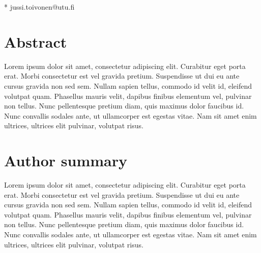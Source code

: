 \documentclass[10pt,letterpaper]{article}
\newcommand{\turku}{Turku, Finland}
\newcommand{\utu}{University of Turku}
\newcommand{\deptft}{Dept.\ of Future Technologies}
\begin{document}
\begin{flushleft}
% 


* jussi.toivonen@utu.fi

\end{flushleft}
\section*{Abstract}
Lorem ipsum dolor sit amet, consectetur adipiscing elit. Curabitur eget porta erat. Morbi consectetur est vel gravida pretium. Suspendisse ut dui eu ante cursus gravida non sed sem. Nullam sapien tellus, commodo id velit id, eleifend volutpat quam. Phasellus mauris velit, dapibus finibus elementum vel, pulvinar non tellus. Nunc pellentesque pretium diam, quis maximus dolor faucibus id. Nunc convallis sodales ante, ut ullamcorper est egestas vitae. Nam sit amet enim ultrices, ultrices elit pulvinar, volutpat risus.


\section*{Author summary}
Lorem ipsum dolor sit amet, consectetur adipiscing elit. Curabitur eget porta erat. Morbi consectetur est vel gravida pretium. Suspendisse ut dui eu ante cursus gravida non sed sem. Nullam sapien tellus, commodo id velit id, eleifend volutpat quam. Phasellus mauris velit, dapibus finibus elementum vel, pulvinar non tellus. Nunc pellentesque pretium diam, quis maximus dolor faucibus id. Nunc convallis sodales ante, ut ullamcorper est egestas vitae. Nam sit amet enim ultrices, ultrices elit pulvinar, volutpat risus.
\end{document}
